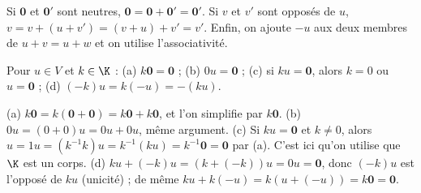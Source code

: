 \begin{preuve}
Si $\mathbf 0$ et $\mathbf 0'$ sont neutres, $\mathbf 0=\mathbf 0+\mathbf 0'=\mathbf 0'$. Si $v$ et $v'$ sont opposés de $u$, $v=v+(u+v')=(v+u)+v'=v'$. Enfin, on ajoute $-u$ aux deux membres de $u+v=u+w$ et on utilise l'associativité.
\end{preuve}
\begin{theoreme}\label{thm-zero}
Pour $u\in V$ et $k\in\K$ : (a) $k\mathbf 0=\mathbf 0$ ; (b) $0u=\mathbf 0$ ; (c) si $ku=\mathbf 0$, alors $k=0$ ou $u=\mathbf 0$ ; (d) $(-k)u=k(-u)=-(ku)$.
\end{theoreme}
\begin{preuve}
(a) $k\mathbf 0=k(\mathbf 0+\mathbf 0)=k\mathbf 0+k\mathbf 0$, et l'on simplifie par $k\mathbf 0$. (b) $0u=(0+0)u=0u+0u$, même argument. (c) Si $ku=\mathbf 0$ et $k\neq0$, alors $u=1u=(k^{-1}k)u=k^{-1}(ku)=k^{-1}\mathbf 0=\mathbf 0$ par (a). C'est ici qu'on utilise que $\K$ est un corps. (d) $ku+(-k)u=(k+(-k))u=0u=\mathbf 0$, donc $(-k)u$ est l'opposé de $ku$ (unicité) ; de même $ku+k(-u)=k(u+(-u))=k\mathbf 0=\mathbf 0$.
\end{preuve}


